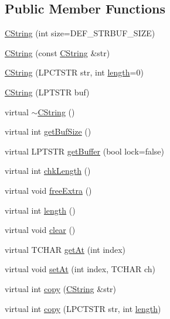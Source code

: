 \subsection*{Public Member Functions}
\begin{DoxyCompactItemize}
\item 
\hyperlink{class_c_string_a3cb66b8f688676f29cdb51c914a15cf7}{C\-String} (int size=D\-E\-F\-\_\-\-S\-T\-R\-B\-U\-F\-\_\-\-S\-I\-Z\-E)
\item 
\hyperlink{class_c_string_a4866844f29a912ee7eb7afcb641ffb8f}{C\-String} (const \hyperlink{class_c_string}{C\-String} \&str)
\item 
\hyperlink{class_c_string_a233297b331dbc4c342745d67ad166b97}{C\-String} (L\-P\-C\-T\-S\-T\-R str, int \hyperlink{class_c_string_a8f131c0e097bea62d809acbc995807b9}{length}=0)
\item 
\hyperlink{class_c_string_a4cc7726fc9fbaa450876ffd98e3e6ff4}{C\-String} (L\-P\-T\-S\-T\-R buf)
\item 
virtual \hyperlink{class_c_string_a65b70fc602655e47340e5d8ae53167f3}{$\sim$\-C\-String} ()
\item 
virtual int \hyperlink{class_c_string_a1cc58a690ea6c9b8c4d7a9118fe3cc18}{get\-Buf\-Size} ()
\item 
virtual L\-P\-T\-S\-T\-R \hyperlink{class_c_string_ac7b886c37095673cc287d24100a9f3fd}{get\-Buffer} (bool lock=false)
\item 
virtual int \hyperlink{class_c_string_a5f5361665c7568d502d058992b14c016}{chk\-Length} ()
\item 
virtual void \hyperlink{class_c_string_a9cb7e6111fd46dd4d16a111ffe4af39d}{free\-Extra} ()
\item 
virtual int \hyperlink{class_c_string_a8f131c0e097bea62d809acbc995807b9}{length} ()
\item 
virtual void \hyperlink{class_c_string_a86bdac885b2d28689a62cbb6ae8b9ee4}{clear} ()
\item 
virtual T\-C\-H\-A\-R \hyperlink{class_c_string_ae1bcd2dd9d59762b41fe898916bfdd23}{get\-At} (int index)
\item 
virtual void \hyperlink{class_c_string_a99eaccef0daa453bf36ec886ae9b42c4}{set\-At} (int index, T\-C\-H\-A\-R ch)
\item 
virtual int \hyperlink{class_c_string_a181b18bf81568cee519617106706963f}{copy} (\hyperlink{class_c_string}{C\-String} \&str)
\item 
virtual int \hyperlink{class_c_string_a98fd9f07225ffd32a683d0ffe3e70bac}{copy} (L\-P\-C\-T\-S\-T\-R str, int \hyperlink{class_c_string_a8f131c0e097bea62d809acbc995807b9}{length})

\end{DoxyCompactItemize}
